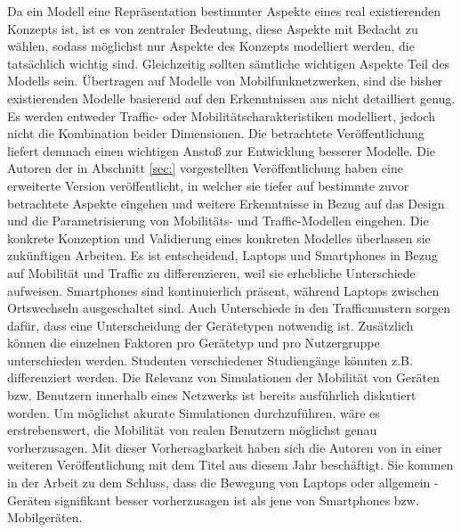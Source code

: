 \documentclass[12pt, a4paper]{article}
\begin{document}
Da ein Modell eine Repräsentation bestimmter Aspekte eines real existierenden Konzepts ist,
ist es von zentraler Bedeutung, diese Aspekte mit Bedacht zu wählen, sodass möglichst nur
Aspekte des Konzepts modelliert werden, die tatsächlich wichtig sind. Gleichzeitig sollten
sämtliche wichtigen Aspekte Teil des Modells sein.
Übertragen auf Modelle von Mobilfunknetzwerken, sind die bisher existierenden Modelle
basierend auf den Erkenntnissen aus \cite{Alipour2018} nicht detailliert genug. Es werden entweder
Traffic- oder Mobilitätscharakteristiken modelliert, jedoch nicht die Kombination beider Dimensionen.
Die betrachtete Veröffentlichung liefert demnach einen wichtigen Anstoß zur Entwicklung besserer Modelle.
\newline\newline
Die Autoren der in Abschnitt \ref{sec:} vorgestellten Veröffentlichung haben eine erweiterte Version veröffentlicht,
in welcher sie tiefer auf bestimmte zuvor betrachtete Aspekte eingehen und weitere Erkenntnisse in Bezug
auf das Design und die Parametrisierung von Mobilitäts- und Traffic-Modellen eingehen.
Die konkrete Konzeption und Validierung eines konkreten Modelles überlassen sie zukünftigen Arbeiten.
Es ist entscheidend, Laptops und Smartphones in Bezug auf Mobilität und Traffic zu differenzieren,
weil sie erhebliche Unterschiede aufweisen. Smartphones sind kontinuierlich präsent, während Laptops
zwischen Ortswechseln ausgeschaltet sind. Auch Unterschiede in den Trafficmustern sorgen dafür, dass
eine Unterscheidung der Gerätetypen notwendig ist. Zusätzlich können die einzelnen Faktoren
pro Gerätetyp und pro Nutzergruppe unterschieden werden. Studenten verschiedener Studiengänge könnten z.B.
differenziert werden.
\newline\newline
Die Relevanz von Simulationen der Mobilität von Geräten bzw. Benutzern innerhalb eines Netzwerks
ist bereits ausführlich diskutiert worden. Um möglichst akurate Simulationen durchzuführen, wäre es erstrebenswert,
die Mobilität von realen Benutzern möglichst genau vorherzusagen. Mit dieser Vorhersagbarkeit haben sich die Autoren
von \cite{Alipour2018} in einer weiteren Veröffentlichung mit dem Titel \cite{Alipour2019} aus diesem Jahr beschäftigt.
Sie kommen in der Arbeit zu dem Schluss, dass die Bewegung von Laptops oder allgemein -Geräten
signifikant besser vorherzusagen ist als jene von Smartphones bzw. Mobilgeräten.\newline
\end{document}
